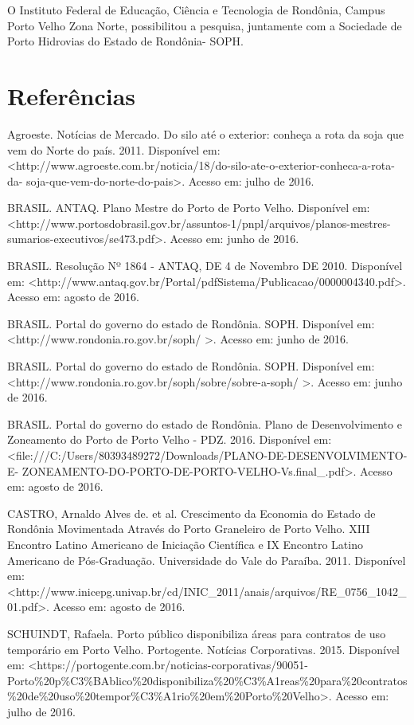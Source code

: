 \documentclass[article,12pt,onesidea,4paper,english,brazil]{abntex2}
\begin{document}
	O Instituto Federal de Educação, Ciência e Tecnologia de Rondônia, Campus Porto Velho Zona Norte, possibilitou a pesquisa, juntamente com a Sociedade de Porto Hidrovias do Estado de Rondônia- SOPH.
	
	\section*{Referências}
	
	\sloppy
	
\noindent Agroeste. Notícias de Mercado. Do silo até o exterior: conheça a rota da soja que vem do Norte do país. 2011. Disponível em:
<http://www.agroeste.com.br/noticia/18/do-silo-ate-o-exterior-conheca-a-rota-da- soja-que-vem-do-norte-do-pais>. Acesso em: julho de 2016.

\noindent BRASIL. ANTAQ. Plano Mestre do Porto de Porto Velho. Disponível em:
<http://www.portosdobrasil.gov.br/assuntos-1/pnpl/arquivos/planos-mestres- sumarios-executivos/se473.pdf>. Acesso em: junho de 2016.

\noindent BRASIL. Resolução Nº 1864 - ANTAQ, DE 4 de Novembro DE 2010. Disponível em:
<http://www.antaq.gov.br/Portal/pdfSistema/Publicacao/0000004340.pdf>. Acesso em: agosto de 2016.

\noindent BRASIL. Portal do governo do estado de Rondônia. SOPH. Disponível em:
<http://www.rondonia.ro.gov.br/soph/ >. Acesso em: junho de 2016.

\noindent BRASIL. Portal do governo do estado de Rondônia. SOPH. Disponível em:
<http://www.rondonia.ro.gov.br/soph/sobre/sobre-a-soph/ >. Acesso em: junho de 2016.

\noindent BRASIL. Portal do governo do estado de Rondônia. Plano de Desenvolvimento e Zoneamento do Porto de Porto Velho - PDZ. 2016. Disponível em:
<file:///C:/Users/80393489272/Downloads/PLANO-DE-DESENVOLVIMENTO-E- ZONEAMENTO-DO-PORTO-DE-PORTO-VELHO-Vs.final\_.pdf>. Acesso em: agosto de 2016.


\noindent CASTRO, Arnaldo Alves de. et al. Crescimento da Economia do Estado de Rondônia Movimentada Através do Porto Graneleiro de Porto Velho. XIII Encontro Latino Americano de Iniciação Científica e IX Encontro Latino Americano de Pós-Graduação. Universidade do Vale do Paraíba. 2011. Disponível em:
<http://www.inicepg.univap.br/cd/INIC\_2011/anais/arquivos/RE\_0756\_1042\_01.pdf>. Acesso em: agosto de 2016.

\noindent SCHUINDT, Rafaela. Porto público disponibiliza áreas para contratos de uso temporário em Porto Velho. Portogente. Notícias Corporativas. 2015. Disponível em: <https://portogente.com.br/noticias-corporativas/90051- Porto\%20p\%C3\%BAblico\%20disponibiliza\%20\%C3\%A1reas\%20para\%20contratos
\%20de\%20uso\%20tempor\%C3\%A1rio\%20em\%20Porto\%20Velho>. Acesso em: julho de 2016.
	
\end{document}
